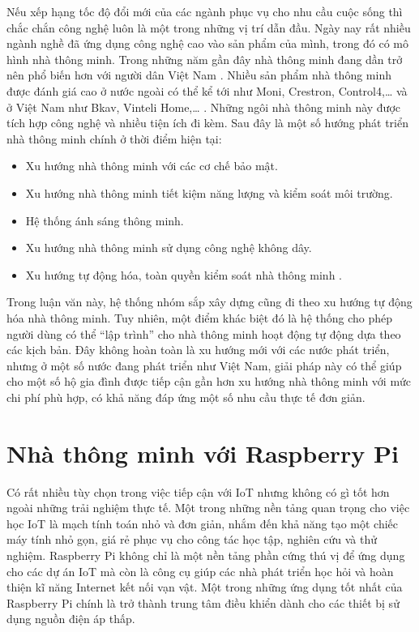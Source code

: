 \documentclass[12pt,a4paper,oneside]{extbook}
\begin{document}
Nếu xếp hạng tốc độ đổi mới của các ngành phục vụ cho nhu cầu cuộc sống thì chắc chắn công nghệ luôn là một trong những vị trí dẫn đầu. Ngày nay rất nhiều ngành nghề đã ứng dụng công nghệ cao vào sản phẩm của mình, trong đó có mô hình nhà thông minh. Trong những năm gần đây nhà thông minh đang dần trở nên phổ biến hơn với người dân Việt Nam \cite{smarthome-trend-2016}. Nhiều sản phẩm nhà thông minh được đánh giá cao ở nước ngoài có thể kể tới như Moni, Crestron, Control4,\dots\hspace{0mm} và ở Việt Nam như Bkav, Vinteli Home,\dots\hspace{0mm} \cite{the-best-smarthome}. Những ngôi nhà thông minh này được tích hợp công nghệ và nhiều tiện ích đi kèm. Sau đây là một số hướng phát triển nhà thông minh chính ở thời điểm hiện tại:

\begin{itemize}[topsep=1mm,itemsep=-0.5mm]
\item Xu hướng nhà thông minh với các cơ chế bảo mật.
\item Xu hướng nhà thông minh tiết kiệm năng lượng và kiểm soát môi trường.
\item Hệ thống ánh sáng thông minh.
\item Xu hướng nhà thông minh sử dụng công nghệ không dây.
\item Xu hướng tự động hóa, toàn quyền kiểm soát nhà thông minh \cite{top-4-smarthome}.
\vspace{1mm}
\end{itemize}

\noindent
Trong luận văn này, hệ thống nhóm sắp xây dựng cũng đi theo xu hướng tự động hóa nhà thông minh. Tuy nhiên, một điểm khác biệt đó là hệ thống cho phép người dùng có thể “lập trình” cho nhà thông minh hoạt động tự động dựa theo các kịch bản. Đây không hoàn toàn là xu hướng mới với các nước phát triển, nhưng ở một số nước đang phát triển như Việt Nam, giải pháp này có thể giúp cho một số hộ gia đình được tiếp cận gần hơn xu hướng nhà thông minh với mức chi phí phù hợp, có khả năng đáp ứng một số nhu cầu thực tế đơn giản.

\section{Nhà thông minh với Raspberry Pi}
Có rất nhiều tùy chọn trong việc tiếp cận với IoT nhưng không có gì tốt hơn ngoài những trải nghiệm thực tế. Một trong những nền tảng quan trọng cho việc học IoT là mạch tính toán nhỏ và đơn giản, nhắm đến khả năng tạo một chiếc máy tính nhỏ gọn, giá rẻ phục vụ cho công tác học tập, nghiên cứu và thử nghiệm. Raspberry Pi không chỉ là một nền tảng phần cứng thú vị để ứng dụng cho các dự án IoT mà còn là công cụ giúp các nhà phát triển học hỏi và hoàn thiện kĩ năng Internet kết nối vạn vật. Một trong những ứng dụng tốt nhất của Raspberry Pi chính là trở thành trung tâm điều khiển dành cho các thiết bị sử dụng nguồn điện áp thấp.
\end{document}
